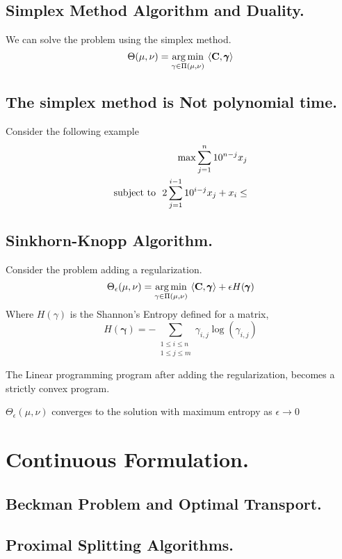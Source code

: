 \subsection{Simplex Method Algorithm and Duality.}
We can solve the problem using the simplex method.
\begin{equation}
	\Theta(\mu, \nu)=\displaystyle {\underset {\gamma\in \Pi(\mu, \nu)}{\operatorname {arg\,min} }}\ {\left\langle \mathbf{C}, \pmb{\gamma} \right\rangle}
\end{equation}
\subsection{The simplex method is Not polynomial time.}
Consider the following example
\begin{align}
	\max \sum_{j=1}^{n} 10^{n-j}x_j\\
	\text{subject to }\ 2\sum_{j=1}^{i-1}10^{i-j}x_j+x_i \leq 
\end{align}

\subsection{Sinkhorn-Knopp Algorithm.}
Consider the problem adding a regularization.
\begin{equation}
	\Theta_\epsilon(\mu, \nu)=\displaystyle {\underset {\gamma\in \Pi(\mu, \nu)}{\operatorname {arg\,min} }}\ {\left\langle \mathbf{C},\pmb{\gamma} \right\rangle+\epsilon H(\pmb{\gamma})}
\end{equation}
Where $H(\gamma)$ is the Shannon's Entropy defined for a matrix,
\begin{equation}
	H(\pmb{\gamma})=-\sum_{\substack{1\leq i \leq n\\ 1\leq j \leq m}}\gamma_{i,j}\log(\gamma_{i,j})
\end{equation} 

\begin{theorem}
	The Linear programming program after adding the regularization, becomes a strictly convex program.
\end{theorem}
\begin{theorem}
	$\Theta_\epsilon(\mu, \nu)$ converges to the solution with maximum entropy as $\epsilon\rightarrow 0$
\end{theorem}
\section{Continuous Formulation.}
\subsection{Beckman Problem and Optimal Transport.}
\subsection{Proximal Splitting Algorithms.}

